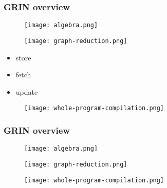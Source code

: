 \documentclass[bigger,aspectratio=169]{beamer}
\begin{document}
\begin{frame}[fragile]
\frametitle{GRIN overview}
\begin{center}

	\begin{minipage}{0.30\textwidth}
		\begin{figure}
			\texttt{[image: algebra.png]}
		\end{figure}
	\end{minipage}
	\hfill
	\begin{minipage}{0.30\textwidth}
		\vspace{1cm}
		\begin{figure}
			\texttt{[image: graph-reduction.png]}
		\end{figure}
		\vspace{-0.5cm}
		\begin{itemize}
			\item<1-> store
			\item<2-> fetch
			\item<3-> update
		\end{itemize}
	\end{minipage}
	\hfill
	\begin{minipage}{0.30\textwidth}
		\begin{figure}
			\texttt{[image: whole-program-compilation.png]}
		\end{figure}
	\end{minipage}

\end{center}
\end{frame}

\begin{frame}[fragile]
\frametitle{GRIN overview}
\begin{center}

	\begin{minipage}{0.30\textwidth}
		\begin{figure}
			\texttt{[image: algebra.png]}
		\end{figure}
	\end{minipage}
	\hfill
	\begin{minipage}{0.30\textwidth}
		\begin{figure}
			\texttt{[image: graph-reduction.png]}
		\end{figure}
	\end{minipage}
	\hfill
	\begin{minipage}{0.30\textwidth}
		\begin{figure}
			\texttt{[image: whole-program-compilation.png]}
		\end{figure}
	\end{minipage}

\end{center}
\end{frame}
\end{document}
